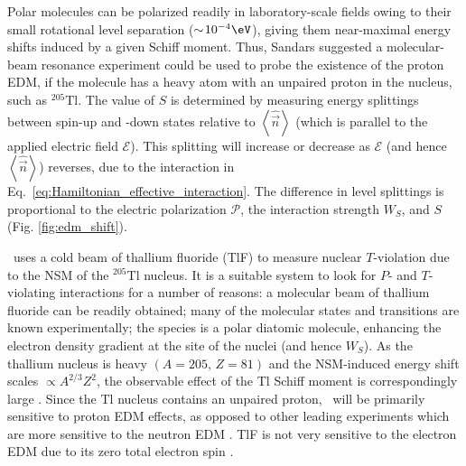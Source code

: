 Polar molecules can be polarized readily in laboratory-scale fields owing to their small rotational level separation ($\sim\!10^{-4}\eV$), giving them near-maximal energy shifts induced by a given Schiff moment. Thus, Sandars \cite{sandars1967measurability} suggested a molecular-beam resonance experiment could be used to probe the existence of the proton EDM, if the molecule has a heavy atom with an unpaired proton in the nucleus, such as $^{205}\mathrm{Tl}$. The value of $S$ is determined by measuring energy splittings between spin-up and -down states relative to $\left\langle \hat{\vec{n}}\right\rangle$ (which is parallel to the applied electric field $\bm{\mathcal{E}}$). This splitting will increase or decrease as $\bm{\mathcal{E}}$ (and hence $\left\langle \hat{\vec{n}}\right\rangle$) reverses, due to the interaction in Eq.~\ref{eq:Hamiltonian_effective_interaction}. The difference in level splittings is proportional to the electric polarization $\mathcal{P}$, the interaction strength $W_S$, and $S$ (Fig. \ref{fig:edm_shift}).

\CENTREX\ uses a cold beam of thallium fluoride (TlF) to measure nuclear $T$-violation due to the NSM of the $^{205}$Tl nucleus. It is a suitable system to look for $P$- and $T$-violating interactions for a number of reasons: a molecular beam of thallium fluoride can be readily obtained; many of the molecular states and transitions are known experimentally; the species is a polar diatomic molecule, enhancing the electron density gradient at the site of the nuclei (and hence $W_S$). As the thallium nucleus is heavy $\left(A=205,\,Z=81\right)$ and the NSM-induced energy shift scales $\propto A^{2/3}Z^2$, the observable effect of the Tl Schiff moment is correspondingly large \cite{sandars1967measurability, wilkening1984search}. Since the Tl nucleus contains an unpaired proton,
\CENTREX\ will be primarily sensitive to proton EDM effects, as opposed to other leading experiments which are more sensitive to the
neutron EDM \cite{graner2016reduced}. TlF is not very sensitive to the electron EDM due to its zero total electron spin \cite{kozlov1995parity}. 

